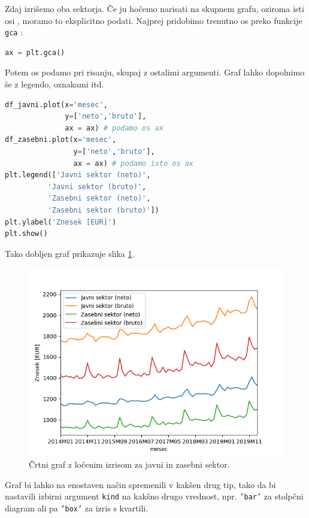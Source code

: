 Zdaj izrišemo oba sektorja. Če ju hočemo narisati na skupnem grafu, oziroma isti osi , moramo to eksplicitno podati. Najprej pridobimo trenutno os preko funkcije \texttt{gca} :
\begin{lstlisting}[language=python]
ax = plt.gca()
\end{lstlisting}
Potem os podamo pri risanju, skupaj z ostalimi argumenti. Graf lahko dopolnimo še z legendo, oznakami itd.
\begin{lstlisting}[language=python]
df_javni.plot(x='mesec',
              y=['neto','bruto'],
              ax = ax) # podamo os ax
df_zasebni.plot(x='mesec',
                y=['neto','bruto'],
                ax = ax) # podamo isto os ax
plt.legend(['Javni sektor (neto)',
          'Javni sektor (bruto)',
          'Zasebni sektor (neto)',
          'Zasebni sektor (bruto)'])
plt.ylabel('Znesek [EUR]')
plt.show()
\end{lstlisting}
Tako dobljen graf prikazuje slika \ref{img:plt_pandas2}.
\begin{figure}
    \includegraphics[width=\linewidth]{img/plt_pandas2.png}
    \caption{Črtni graf z ločenim izrisom za javni in zasebni sektor.}
    \label{img:plt_pandas2}
\end{figure}
Graf bi lahko na enostaven način spremenili v kakšen drug tip, tako da bi nastavili izbirni argument \texttt{kind} na kakšno drugo vrednost, npr. \texttt{'bar'} za stolpčni diagram ali pa \texttt{'box'} za izris s kvartili.

